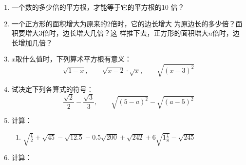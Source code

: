 \begin{enumerate}
\item 一个数的多少倍的平方根，才能等于它的平方根的10
倍？
\item 一个正方形的面积增大为原来的2倍时，它的边长增大
为原边长的多少倍？面积要增大3倍时，边长增大几倍？这
样推下去，正方形的面积增大$n$倍时，边长增加几倍？
\item $x$取什么值时，下列算术平方根有意义：
\[\sqrt{1-x},\qquad \sqrt{x-2}\cdot \sqrt{x},\qquad \sqrt{(x-3)^2}  \]

\item 试决定下列各算式的符号：
\[\frac{\sqrt{2}}{2}-\frac{\sqrt{3}}{3},\qquad \sqrt{(5-a)^2}-\sqrt{(a-5)^2} \]

\item 计算：
\begin{enumerate}
    \item $\sqrt{\frac{1}{2}}+\sqrt{45}-\sqrt{12.5}-0.5\sqrt{200}+\sqrt{242}+6\sqrt{1\frac{1}{8}}-\sqrt{245}$
\end{enumerate}

\item 计算：
\begin{enumerate}
\end{enumerate}


\end{enumerate}
